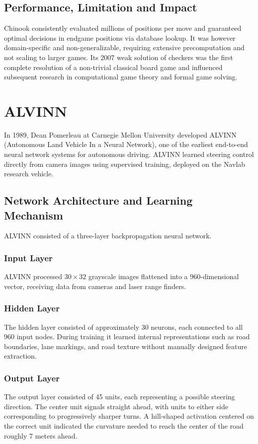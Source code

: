 \documentclass[12pt,a4paper]{report}
\begin{document}
\subsection{Performance, Limitation and Impact}
Chinook consistently evaluated millions of positions per move and guaranteed optimal decisions in endgame positions via database lookup. It was however domain-specific and non-generalizable, requiring extensive precomputation and not scaling to larger games. Its 2007 weak solution of checkers was the first complete resolution of a non-trivial classical board game and influenced subsequent research in computational game theory and formal game solving.

\section{ALVINN}
In 1989, Dean Pomerleau at Carnegie Mellon University developed ALVINN (Autonomous Land Vehicle In a Neural Network), one of the earliest end-to-end neural network systems for autonomous driving. ALVINN learned steering control directly from camera images using supervised training, deployed on the Navlab research vehicle.

\subsection{Network Architecture and Learning Mechanism}
ALVINN consisted of a three-layer backpropagation neural network.

\subsubsection{Input Layer}
ALVINN processed $30\times32$ grayscale images flattened into a 960-dimensional vector, receiving data from cameras and laser range finders.

\subsubsection{Hidden Layer}
The hidden layer consisted of approximately 30 neurons, each connected to all 960 input nodes. During training it learned internal representations such as road boundaries, lane markings, and road texture without manually designed feature extraction.

\subsubsection{Output Layer}
The output layer consisted of 45 units, each representing a possible steering direction. The center unit signals straight ahead, with units to either side corresponding to progressively sharper turns. A hill-shaped activation centered on the correct unit indicated the curvature needed to reach the center of the road roughly 7 meters ahead.
\end{document}
